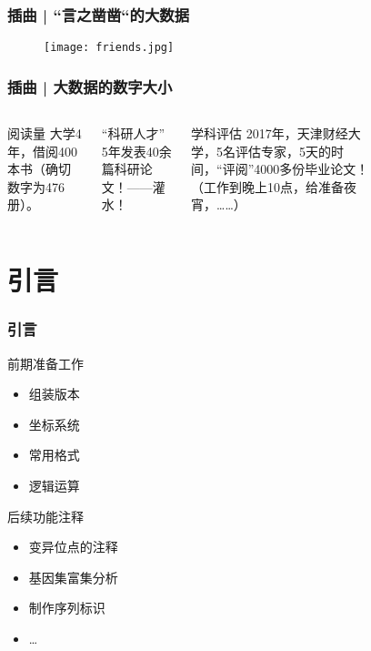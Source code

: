 \begin{frame}
  \frametitle{插曲 | “言之凿凿“的大数据}
  \begin{figure}
    \centering
    \texttt{[image: friends.jpg]}
  \end{figure}
\end{frame}

\begin{frame}
  \frametitle{插曲 | 大数据的数字大小}
  \begin{columns}
  \begin{block}{阅读量}
    大学4年，借阅400本书（确切数字为476册）。
  \end{block}
  \pause
  \pause
  \begin{block}{“科研人才”}
    5年发表40余篇科研论文！——灌水！
  \end{block}
  \pause
  \begin{block}{学科评估}
    2017年，天津财经大学，5名评估专家，5天的时间，“评阅”4000多份毕业论文！（工作到晚上10点，给准备夜宵，……）
  \end{block}
    \begin{figure}
      \centering
    \end{figure}
  \end{columns}
\end{frame}

\section{引言}
\begin{frame}
  \frametitle{引言}
  \begin{block}{前期准备工作}
    \begin{itemize}
      \item 组装版本
      \item 坐标系统
      \item 常用格式
      \item 逻辑运算
    \end{itemize}
  \end{block}
  \pause
  \begin{block}{后续功能注释}
    \begin{itemize}
      \item 变异位点的注释
      \item 基因集富集分析
      \item 制作序列标识
      \item \ldots
    \end{itemize}
  \end{block}
\end{frame}

